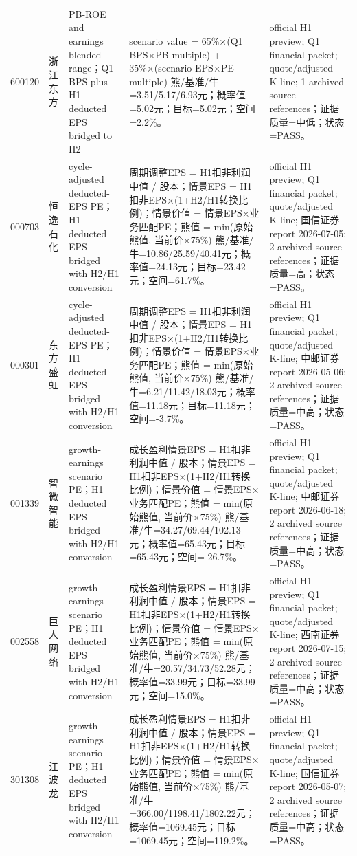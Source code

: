 \begin{longtable}{L{0.85cm}L{1.55cm}L{2.25cm}L{6.0cm}L{4.0cm}}
600120 & 浙江东方 & PB-ROE and earnings blended range；Q1 BPS plus H1 deducted EPS bridged to H2 & scenario value = 65\%×(Q1 BPS×PB multiple) + 35\%×(scenario EPS×PE multiple) 熊/基准/牛=3.51/5.17/6.93元；概率值=5.02元；目标=5.02元；空间=2.2\%。 & official H1 preview; Q1 financial packet; quote/adjusted K-line; 1 archived source references；证据质量=中低；状态=PASS。 \\
000703 & 恒逸石化 & cycle-adjusted deducted-EPS PE；H1 deducted EPS bridged with H2/H1 conversion & 周期调整EPS = H1扣非利润中值 / 股本；情景EPS = H1扣非EPS×(1+H2/H1转换比例)；情景价值 = 情景EPS×业务匹配PE；熊值 = min(原始熊值, 当前价×75\%) 熊/基准/牛=10.86/25.59/40.41元；概率值=24.13元；目标=23.42元；空间=61.7\%。 & official H1 preview; Q1 financial packet; quote/adjusted K-line; 国信证券 report 2026-07-05; 2 archived source references；证据质量=高；状态=PASS。 \\
000301 & 东方盛虹 & cycle-adjusted deducted-EPS PE；H1 deducted EPS bridged with H2/H1 conversion & 周期调整EPS = H1扣非利润中值 / 股本；情景EPS = H1扣非EPS×(1+H2/H1转换比例)；情景价值 = 情景EPS×业务匹配PE；熊值 = min(原始熊值, 当前价×75\%) 熊/基准/牛=6.21/11.42/18.03元；概率值=11.18元；目标=11.18元；空间=-3.7\%。 & official H1 preview; Q1 financial packet; quote/adjusted K-line; 中邮证券 report 2026-05-06; 2 archived source references；证据质量=中高；状态=PASS。 \\
001339 & 智微智能 & growth-earnings scenario PE；H1 deducted EPS bridged with H2/H1 conversion & 成长盈利情景EPS = H1扣非利润中值 / 股本；情景EPS = H1扣非EPS×(1+H2/H1转换比例)；情景价值 = 情景EPS×业务匹配PE；熊值 = min(原始熊值, 当前价×75\%) 熊/基准/牛=34.27/69.44/102.13元；概率值=65.43元；目标=65.43元；空间=-26.7\%。 & official H1 preview; Q1 financial packet; quote/adjusted K-line; 中邮证券 report 2026-06-18; 2 archived source references；证据质量=中高；状态=PASS。 \\
002558 & 巨人网络 & growth-earnings scenario PE；H1 deducted EPS bridged with H2/H1 conversion & 成长盈利情景EPS = H1扣非利润中值 / 股本；情景EPS = H1扣非EPS×(1+H2/H1转换比例)；情景价值 = 情景EPS×业务匹配PE；熊值 = min(原始熊值, 当前价×75\%) 熊/基准/牛=20.57/34.73/52.28元；概率值=33.99元；目标=33.99元；空间=15.0\%。 & official H1 preview; Q1 financial packet; quote/adjusted K-line; 西南证券 report 2026-07-15; 2 archived source references；证据质量=中高；状态=PASS。 \\
301308 & 江波龙 & growth-earnings scenario PE；H1 deducted EPS bridged with H2/H1 conversion & 成长盈利情景EPS = H1扣非利润中值 / 股本；情景EPS = H1扣非EPS×(1+H2/H1转换比例)；情景价值 = 情景EPS×业务匹配PE；熊值 = min(原始熊值, 当前价×75\%) 熊/基准/牛=366.00/1198.41/1802.22元；概率值=1069.45元；目标=1069.45元；空间=119.2\%。 & official H1 preview; Q1 financial packet; quote/adjusted K-line; 国信证券 report 2026-05-07; 2 archived source references；证据质量=中高；状态=PASS。 \\

\end{longtable}
